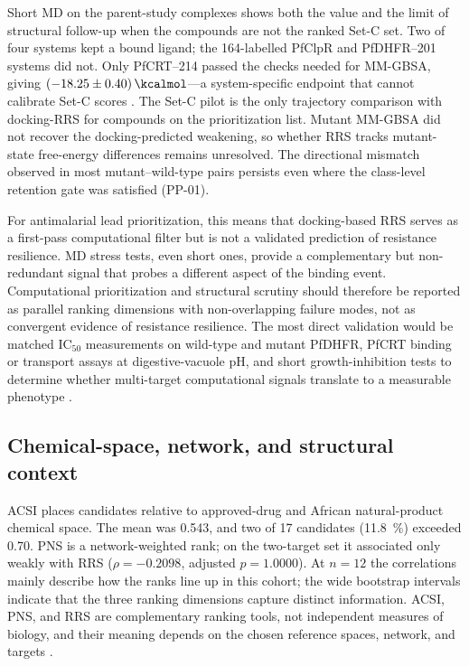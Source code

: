 \documentclass[journal=jcisd8,manuscript=article,layout=traditional]{achemso}
\begin{document}
Short MD on the parent-study complexes shows both the value and the limit of structural follow-up when the compounds are not the ranked Set-C set. Two of four systems kept a bound ligand; the 164-labelled PfClpR and PfDHFR--201 systems did not. Only PfCRT--214 passed the checks needed for MM-GBSA, giving $\qty{-18.25 \pm 0.40}{\kcalmol}$---a system-specific endpoint that cannot calibrate Set-C scores \citep{wang2019_mmgbsa,gmx_mmpbsa_2021}. The Set-C pilot is the only trajectory comparison with docking-RRS for compounds on the prioritization list. Mutant MM-GBSA did not recover the docking-predicted weakening, so whether RRS tracks mutant-state free-energy differences remains unresolved. The directional mismatch observed in most mutant--wild-type pairs persists even where the class-level retention gate was satisfied (PP-01).

For antimalarial lead prioritization, this means that docking-based RRS serves as a first-pass computational filter but is not a validated prediction of resistance resilience. MD stress tests, even short ones, provide a complementary but non-redundant signal that probes a different aspect of the binding event. Computational prioritization and structural scrutiny should therefore be reported as parallel ranking dimensions with non-overlapping failure modes, not as convergent evidence of resistance resilience. The most direct validation would be matched IC$_{50}$ measurements on wild-type and mutant PfDHFR, PfCRT binding or transport assays at digestive-vacuole pH, and short growth-inhibition tests to determine whether multi-target computational signals translate to a measurable phenotype \citep{mlsypredc2024}.

\subsection{Chemical-space, network, and structural context}

ACSI places candidates relative to approved-drug and African natural-product chemical space. The mean was \num{0.543}, and two of \num{17} candidates (\qty{11.8}{\percent}) exceeded \num{0.70}. PNS is a network-weighted rank; on the two-target set it associated only weakly with RRS ($\rho=\num{-0.2098}$, adjusted $p=\num{1.0000}$). At $n=\num{12}$ the correlations mainly describe how the ranks line up in this cohort; the wide bootstrap intervals indicate that the three ranking dimensions capture distinct information. ACSI, PNS, and RRS are complementary ranking tools, not independent measures of biology, and their meaning depends on the chosen reference spaces, network, and targets \citep{anpdb_2026,value_addition_african_np_2025,Sentinel2025Offtarget}.
\end{document}
